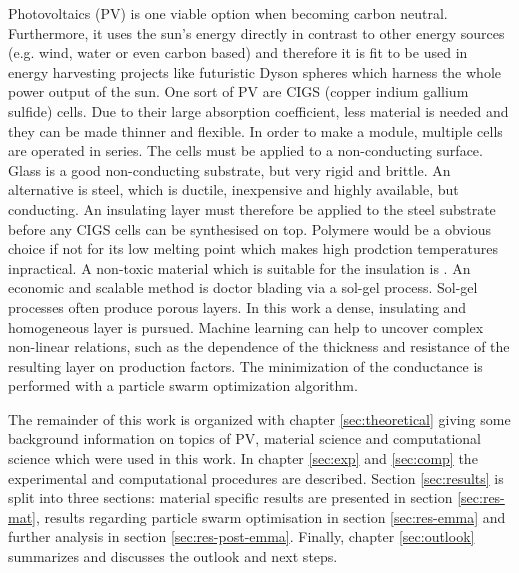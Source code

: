 Photovoltaics (PV) is one viable option when becoming carbon neutral. 
Furthermore, 
it uses the sun's energy directly in contrast to other energy sources (e.g. wind, water or even carbon based) and therefore 
it is fit to be used in energy harvesting projects like futuristic Dyson spheres\cite{dyson1960search} which harness the whole power output of the sun.
%
One sort of PV are CIGS (copper indium gallium sulfide) cells\cite{Vasekar2010}. 
Due to their large absorption coefficient, less material is needed and they can be made thinner and flexible. 
In order to make a module, multiple cells are operated in series. 
The cells must be applied to a non-conducting surface.
Glass is a good non-conducting substrate, but very rigid and brittle. 
An alternative is steel, which is ductile, inexpensive and highly available, but conducting. 
An insulating layer must therefore be applied to the steel substrate before any CIGS cells can be synthesised on top.
Polymere would be a obvious choice if not for its low melting point which makes high prodction temperatures inpractical.
A non-toxic material which is suitable for the insulation is . 
An economic and scalable method is doctor blading via a sol-gel process. 
Sol-gel processes often produce porous layers. 
In this work a dense, insulating and homogeneous layer is pursued. 
Machine learning can help to uncover complex non-linear relations, such as the 
dependence of the thickness and resistance of the resulting layer on production factors.
The minimization of the conductance is performed with a particle swarm optimization 
algorithm. 


The remainder of this work is organized with chapter 
\ref{sec:theoretical} giving 
some background information on topics of PV, material science and computational science which were used in this work.
In chapter \ref{sec:exp} and \ref{sec:comp} the experimental and computational procedures are described. 
Section \ref{sec:results} is split into three sections: material specific results are presented in section \ref{sec:res-mat}, results regarding particle swarm optimisation in section \ref{sec:res-emma} and further analysis in section \ref{sec:res-post-emma}.
Finally, chapter \ref{sec:outlook} summarizes and discusses the outlook and next steps.


